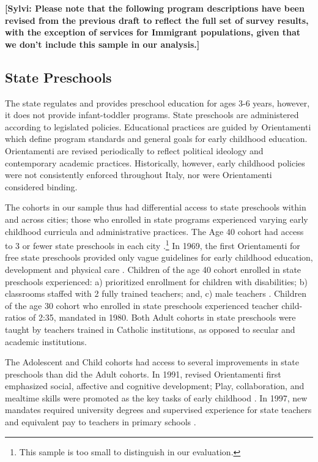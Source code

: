 
\textbf{[Sylvi: Please note that the following program descriptions have been revised from the previous draft to reflect the full set of survey results, with the exception of services for Immigrant populations, given that we don't include this sample in our analysis.]} 

\subsection{State Preschools}

The state regulates and provides preschool education for ages 3-6 years, however, it does not provide infant-toddler programs. State preschools are administered according to legislated policies. Educational practices are guided by Orientamenti which define program standards and general goals for early childhood education. Orientamenti are revised periodically to reflect political ideology and contemporary academic practices. Historically, however, early childhood policies were not consistently enforced throughout Italy, nor were Orientamenti considered binding. 

The cohorts in our sample thus had differential access to state preschools within and across cities; those who enrolled in state programs experienced varying early childhood curricula and administrative practices. The Age 40 cohort had access to 3 or fewer state preschools in each city \citep{Reggio-Admin-data_1966-2006, Reggio-Annual-Journals_1994-2011, Padova-Admin-Data_1964-2011}.\footnote{This sample is too small to distinguish in our evaluation.} In 1969, the first Orientamenti for free state preschools provided only vague guidelines for early childhood education, development and physical care \citep{Corsaro_1996_Early-Edu,Hohnerlein_2015_Development-and-Diffusion}. Children of the age 40 cohort enrolled in state preschools experienced: a) prioritized enrollment for children with disabilities; b) classrooms staffed with 2 fully trained teachers; and, c) male teachers \citep{Hohnerlein_2015_Development-and-Diffusion}. Children of the age 30 cohort who enrolled in state preschools experienced teacher child-ratios of 2:35, mandated in 1980. Both Adult cohorts in state preschools were taught by teachers trained in Catholic institutions, as opposed to secular and academic institutions.

The Adolescent and Child cohorts had access to several improvements in state preschools than did the Adult cohorts. In 1991, revised Orientamenti first emphasized social, affective and cognitive development; Play, collaboration, and mealtime skills were promoted as the key tasks of early childhood \citep{Corsaro_1996_Early-Edu}. In 1997, new mandates required university degrees and supervised experience for state teachers and equivalent pay to teachers in primary schools \citep{Ghedini_2001_Ital-Natl-Policy}. 

